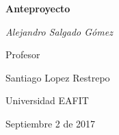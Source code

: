 \begin{titlepage}
    \centering
    \vspace{2cm}

    {\huge\bfseries Anteproyecto\par}
    \vspace{5cm}
    {\Large\itshape Alejandro Salgado Gómez\par}
    \vfill

    Profesor\par
    {\large Santiago Lopez Restrepo\par}

    \vfill

    {\large Universidad EAFIT \par}
    \vspace{0.5cm}
    {\large Septiembre 2 de 2017}
\end{titlepage}
